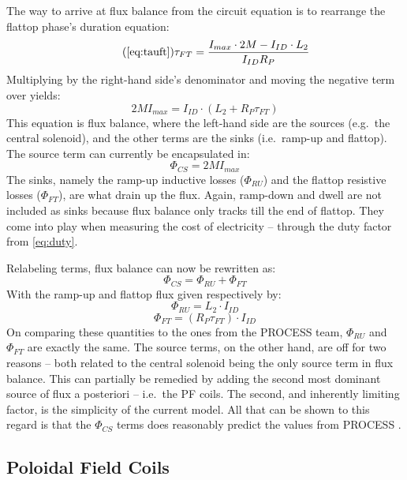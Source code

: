 The way to arrive at flux balance from the circuit equation is to rearrange the flattop phase's duration equation:
\begin{equation}
	\tag{\ref{eq:tauft}}
	\tau_{FT} = \frac{ I_{max} \cdot 2 M - I_{ID} \cdot  L_2 }{I_{ID} R_P}
\end{equation}
Multiplying by the right-hand side's denominator and moving the negative term over yields:
\begin{equation}
	2 M I_{max} = I_{ID} \cdot \left( L_2 + R_P \tau_{FT} \right)
\end{equation}
This equation is flux balance, where the left-hand side are the sources (e.g.\ the central solenoid), and the other terms are the sinks (i.e.\ ramp-up and flattop). The source term can currently be encapsulated in:
\begin{equation}
	\label{eq:phics}
	\Phi_{CS} = 2 M I_{max}
\end{equation}
The sinks, namely the ramp-up inductive losses ($\Phi_{RU}$) and the flattop resistive losses ($\Phi_{FT}$), are what drain up the flux. Again, ramp-down and dwell are not included as sinks because flux balance only tracks till the end of flattop. They come into play when measuring the cost of electricity -- through the duty factor from \cref{eq:duty}.

Relabeling terms, flux balance can now be rewritten as:
\begin{equation}
	\Phi_{CS} = \Phi_{RU} + \Phi_{FT}
\end{equation}
With the ramp-up and flattop flux given respectively by:
\begin{equation}
	\label{eq:phiru}
	\Phi_{RU} = L_2 \cdot I_{ID}
\end{equation}
\begin{equation}
	\label{eq:phift}
	\Phi_{FT} = ( R_P \tau_{FT} ) \cdot I_{ID}
\end{equation}
On comparing these quantities to the ones from the PROCESS team, $\Phi_{RU}$ and $\Phi_{FT}$ are exactly the same. The source terms, on the other hand, are off for two reasons -- both related to the central solenoid being the only source term in flux balance. This can partially be remedied by adding the second most dominant source of flux a posteriori -- i.e.\ the PF coils. The second, and inherently limiting factor, is the simplicity of the current model. All that can be shown to this regard is that the $\Phi_{CS}$ terms does reasonably predict the values from  PROCESS .

\subsection{ Poloidal Field Coils}

